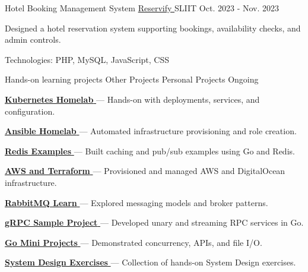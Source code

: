 \begin{cventries}
  \cventry
    {Hotel Booking Management System}
    {\href{https://github.com/nmdra/Reservify}{Reservify \faGithub}}
    {SLIIT}
    {Oct. 2023 - Nov. 2023}
    {
      \begin{cvitems}
        \item {Designed a hotel reservation system supporting bookings, availability checks, and admin controls.}
        \item {Technologies: PHP, MySQL, JavaScript, CSS}
      \end{cvitems}
    }

  \cventry
    {Hands-on learning projects}
    {Other Projects}
    {Personal Projects}
    {Ongoing}
    {
      \begin{cvitems}
        \item {\href{https://github.com/nmdra/K8s-Learn}{\textbf{Kubernetes Homelab} \faGithub} — Hands-on with deployments, services, and configuration.}
        \item {\href{https://github.com/nmdra/Ansible-Learn}{\textbf{Ansible Homelab} \faGithub} — Automated infrastructure provisioning and role creation.}
        \item {\href{https://github.com/nmdra/Redis-Learn}{\textbf{Redis Examples} \faGithub} — Built caching and pub/sub examples using Go and Redis.}
        \item {\href{https://github.com/nmdra/Terraform-Learn}{\textbf{AWS and Terraform} \faGithub} — Provisioned and managed AWS and DigitalOcean infrastructure.}
        \item {\href{https://github.com/nmdra/RabbitMQ-Learn}{\textbf{RabbitMQ Learn} \faGithub} — Explored messaging models and broker patterns.}
        \item {\href{https://github.com/nmdra/gRPC-Learn}{\textbf{gRPC Sample Project} \faGithub} — Developed unary and streaming RPC services in Go.}
        \item {\href{https://github.com/nmdra/Go-Mini-Projects}{\textbf{Go Mini Projects} \faGithub} — Demonstrated concurrency, APIs, and file I/O.}
        \item {\href{https://github.com/nmdra/System-Design-Exercises}{\textbf{System Design Exercises} \faGithub} — Collection of hands-on System Design exercises.}
      \end{cvitems}
    }

\end{cventries}
